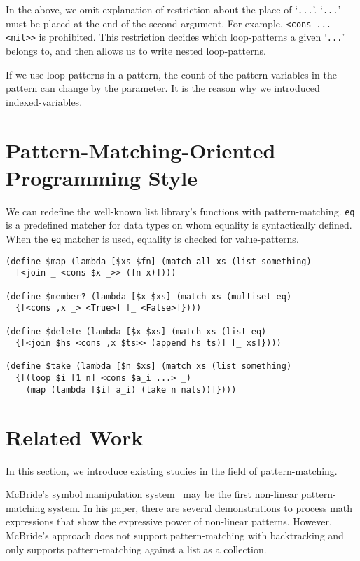 \documentclass{article}
\begin{document}
In the above, we omit explanation of restriction about the place of `\texttt{...}'.
`\texttt{...}' must be placed at the end of the second argument.
For example, \texttt{<cons ... <nil>>} is prohibited.
This restriction decides which loop-patterns a given `\texttt{...}' belongs to, and then allows us to write nested loop-patterns.

If we use loop-patterns in a pattern, the count of the pattern-variables in the pattern can change by the parameter.
It is the reason why we introduced indexed-variables.

\section{Pattern-Matching-Oriented Programming Style}\label{style}

We can redefine the well-known list library's functions with pattern-matching.
\texttt{eq} is a predefined matcher for data types on whom equality is syntactically defined.
When the \texttt{eq} matcher is used, equality is checked for value-patterns.

{\footnotesize
\begin{verbatim}
(define $map (lambda [$xs $fn] (match-all xs (list something)
  [<join _ <cons $x _>> (fn x)])))

(define $member? (lambda [$x $xs] (match xs (multiset eq)
  {[<cons ,x _> <True>] [_ <False>]})))

(define $delete (lambda [$x $xs] (match xs (list eq)
  {[<join $hs <cons ,x $ts>> (append hs ts)] [_ xs]})))

(define $take (lambda [$n $xs] (match xs (list something)
  {[(loop $i [1 n] <cons $a_i ...> _)
    (map (lambda [$i] a_i) (take n nats))]})))
\end{verbatim}
}

\section{Related Work}\label{related}

In this section, we introduce existing studies in the field of pattern-matching.

McBride's symbol manipulation system~\cite{mcbride1970symbol} may be the first non-linear pattern-matching system.
In his paper, there are several demonstrations to process math expressions that show the expressive power of non-linear patterns.
However, McBride's approach does not support pattern-matching with backtracking and only supports pattern-matching against a list as a collection.
\end{document}
